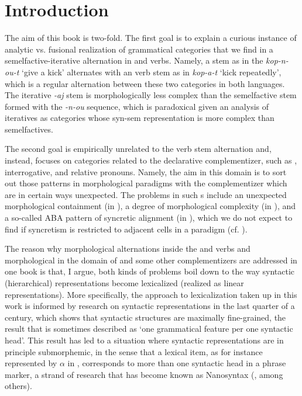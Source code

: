 \chapter{Introduction}


The aim of this book is two-fold. The first goal is to explain a curious instance of analytic vs. fusional realization of grammatical categories that we find in a   semelfactive-iterative alternation in  and  verbs. Namely, a     stem as in the  \textit{kop-n-ou-t} `give a kick' alternates with an  verb stem as in \textit{kop-a-t} `kick repeatedly', which is a regular alternation between these two categories in both languages. The iterative \textit{-aj} stem is morphologically less complex than the semelfactive stem formed with the \textit{-n-ou} sequence, which is paradoxical given an analysis of iteratives as categories whose syn-sem representation is more complex than semelfactives. 
\par
The second goal is empirically unrelated to the verb stem alternation and, instead, focuses on categories related to the declarative complementizer,  such as , interrogative, and  relative pronouns.   Namely, the aim in this domain is to sort out those patterns in morphological paradigms with the complementizer which are in certain ways unexpected.  The problems in such s include an unexpected morphological containment (in ), a degree of morphological complexity (in ), and a so-called  ABA pattern of syncretic alignment (in ), which we do not expect to find if syncretism is restricted to adjacent cells in a paradigm (cf. \citealt{Bobaljik2012}). 
\par
The reason why morphological alternations inside the  and  verbs and morphological  in the domain of  and some other complementizers are addressed in one book is that, I argue, both kinds of problems boil down to the way syntactic (hierarchical) representations become lexicalized (realized as linear representations).  More specifically, the approach to lexicalization taken up in this work is informed by research on syntactic representations in the last quarter of a century, which shows that syntactic structures are maximally fine-grained, the result that is sometimes described as `one grammatical feature per one syntactic head'. This result has led to a situation where syntactic representations are in principle submorphemic, in the sense that a lexical item, as for instance represented by $\alpha$ in \Next, corresponds to more than one syntactic head in a phrase marker, a strand of research that has become known as Nanosyntax (\citealt{Starke2009}, among others).

